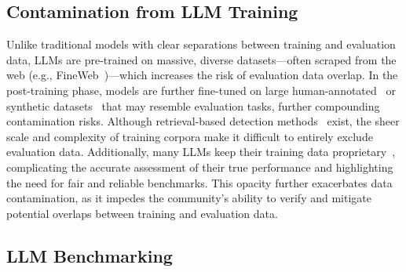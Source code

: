 \subsection{Contamination from LLM Training}
Unlike traditional models with clear separations between training and evaluation data, LLMs are pre-trained on massive, diverse datasets—often scraped from the web (e.g., FineWeb~\cite{penedo2024the})—which increases the risk of evaluation data overlap. In the post-training phase, models are further fine-tuned on large human-annotated~\cite{mukherjee2023orca,kim-etal-2023-cot} or synthetic datasets~\cite{ding2023enhancing,OpenHermes25,wang2023openchat} that may resemble evaluation tasks, further compounding contamination risks. Although retrieval-based detection methods~\cite{team2024gemini,achiam2023gpt} exist, the sheer scale and complexity of training corpora make it difficult to entirely exclude evaluation data. Additionally, many LLMs keep their training data proprietary~\cite{dubey2024llama,yang2024qwen2}, complicating the accurate assessment of their true performance and highlighting the need for fair and reliable benchmarks. This opacity further exacerbates data contamination, as it impedes the community’s ability to verify and mitigate potential overlaps between training and evaluation data.


\subsection{LLM Benchmarking}




